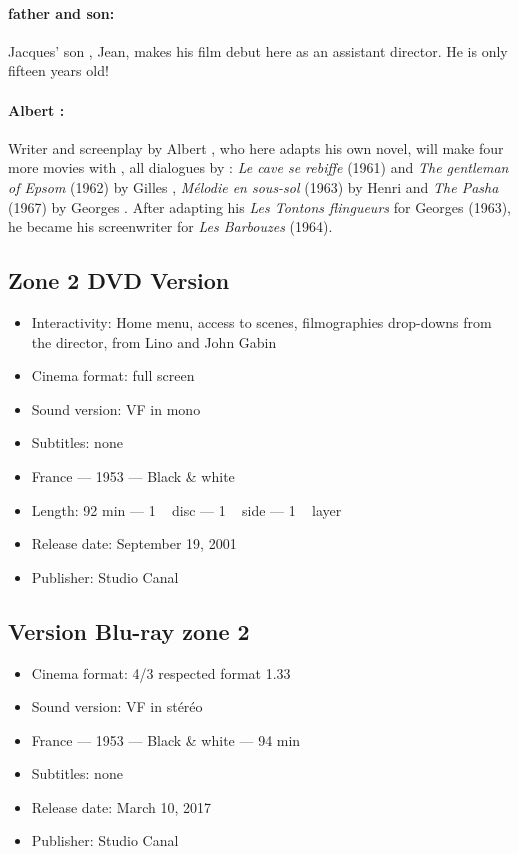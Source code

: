 \paragraph{ father and son:} Jacques' son , Jean, makes his film debut here as an assistant director. He is only fifteen years old!
\paragraph{Albert :} Writer and screenplay by Albert , who here adapts  his own novel, will make four more movies with , all dialogues by : \emph{Le cave se rebiffe} (1961) and \emph{The gentleman of Epsom} (1962) by Gilles , \emph{Mélodie en sous-sol} (1963) by Henri  and \emph{The Pasha} (1967) by Georges . After adapting his \emph{Les Tontons flingueurs} for Georges  (1963), he became his screenwriter for \emph{Les Barbouzes} (1964).

\subsection*{Zone 2 DVD Version}

\begin{itemize}
    \item Interactivity: Home menu, access to scenes, filmographies drop-downs from the director, from Lino  and John \familyname Gabin{}
    \item Cinema format: full screen
    \item Sound version: VF in mono
    \item Subtitles: none
    \item France --- 1953 --- Black \& white
    \item Length: 92 min --- 1 ~ disc --- 1 ~ side --- 1 ~ layer
    \item Release date: September 19, 2001
    \item Publisher: Studio Canal
\end{itemize}

\subsection*{Version Blu-ray zone 2}

\begin{itemize}
	\item Cinema format: 4/3 respected format 1.33
	\item Sound version: VF in stéréo
	\item France --- 1953 --- Black \& white --- 94 min
	\item Subtitles: none
	\item Release date: March 10, 2017
	\item Publisher: Studio Canal
\end{itemize}

